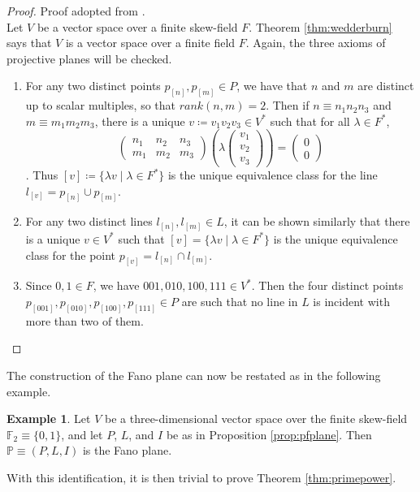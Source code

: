\documentclass{report}
\newcommand{\F}{\mathbb{F}}
\renewcommand{\P}{\mathbb{P}}
\newcommand{\two}[2]{\begin{pmatrix} #1 \\ #2 \end{pmatrix}}
\theoremstyle{definition}\newtheorem*{definition}{Definition}
\theoremstyle{definition}\newtheorem*{example}{Example}
\theoremstyle{remark}\newtheorem*{remark}{Remark}
\begin{document}
\begin{proof}
Proof adopted from \cite{geombook}. \\
Let $ V $ be a vector space over a finite skew-field $ F $. Theorem \ref{thm:wedderburn} says that $ V $ is a vector space over a finite field $ F $. Again, the three axioms of projective planes will be checked.
\begin{enumerate}
  \item For any two distinct points $ p_{[n]}, p_{[m]} \in P $, we have that $ n $ and $ m $ are distinct up to scalar multiples, so that $ rank (n, m) = 2 $. Then if $ n \equiv n_1 n_2 n_3 $ and $ m \equiv m_1 m_2 m_3 $, there is a unique $ v \coloneqq v_1 v_2 v_3 \in V^* $ such that for all $ \lambda \in F^* $, $$ \two{n_1 & n_2 & n_3}{m_1 & m_2 & m_3} \left( \lambda \begin{pmatrix} v_1 \\ v_2 \\ v_3 \end{pmatrix} \right) = \two{0}{0} $$. Thus $ [v] \coloneqq \{ \lambda v \mid \lambda \in F^* \} $ is the unique equivalence class for the line $ l_{[v]} = p_{[n]} \cup p_{[m]} $.
  \item For any two distinct lines $ l_{[n]}, l_{[m]} \in L $, it can be shown similarly that there is a unique $ v \in V^* $ such that $ [v] = \{ \lambda v \mid \lambda \in F^* \} $ is the unique equivalence class for the point $ p_{[v]} = l_{[n]} \cap l_{[m]} $.
  \item Since $ 0, 1 \in F $, we have $ 001, 010, 100, 111 \in V^* $. Then the four distinct points $ p_{[001]}, p_{[010]}, p_{[100]}, p_{[111]} \in P $ are such that no line in $ L $ is incident with more than two of them.
\end{enumerate}
\end{proof}

The construction of the Fano plane can now be restated as in the following example.

\begin{example}
Let $ V $ be a three-dimensional vector space over the finite skew-field $ \F_2 \equiv \{ 0, 1 \} $, and let $ P $, $ L $, and $ I $ be as in Proposition \ref{prop:pfplane}. Then $ \P \equiv (P, L, I) $ is the Fano plane.
\end{example}

With this identification, it is then trivial to prove Theorem \ref{thm:primepower}.
\end{document}
